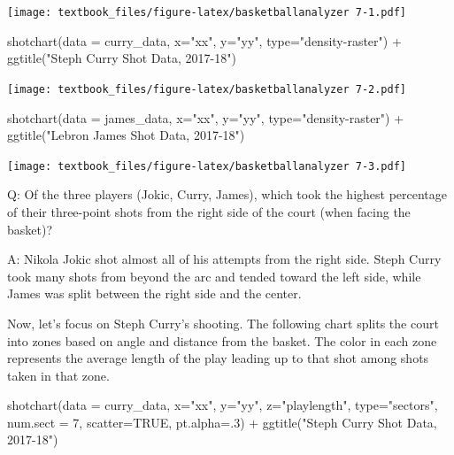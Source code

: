 \documentclass[
  11pt,
]{book}
\newenvironment{Shaded}{\begin{snugshade}}{\end{snugshade}}
\newcommand{\AttributeTok}[1]{\textcolor[rgb]{0.77,0.63,0.00}{#1}}
\newcommand{\ConstantTok}[1]{\textcolor[rgb]{0.00,0.00,0.00}{#1}}
\newcommand{\DecValTok}[1]{\textcolor[rgb]{0.00,0.00,0.81}{#1}}
\newcommand{\FunctionTok}[1]{\textcolor[rgb]{0.00,0.00,0.00}{#1}}
\newcommand{\NormalTok}[1]{#1}
\newcommand{\SpecialCharTok}[1]{\textcolor[rgb]{0.00,0.00,0.00}{#1}}
\newcommand{\StringTok}[1]{\textcolor[rgb]{0.31,0.60,0.02}{#1}}
\theoremstyle{definition}
\theoremstyle{definition}
\theoremstyle{definition}
\theoremstyle{definition}
\theoremstyle{remark}
\begin{document}
\texttt{[image: textbook\_files/figure-latex/basketballanalyzer 7-1.pdf]}

\begin{Shaded}
\begin{Highlighting}[]
\FunctionTok{shotchart}\NormalTok{(}\AttributeTok{data =}\NormalTok{ curry\_data, }\AttributeTok{x=}\StringTok{"xx"}\NormalTok{, }\AttributeTok{y=}\StringTok{"yy"}\NormalTok{, }\AttributeTok{type=}\StringTok{"density{-}raster"}\NormalTok{) }\SpecialCharTok{+} 
  \FunctionTok{ggtitle}\NormalTok{(}\StringTok{"Steph Curry Shot Data, 2017{-}18"}\NormalTok{)}
\end{Highlighting}
\end{Shaded}

\texttt{[image: textbook\_files/figure-latex/basketballanalyzer 7-2.pdf]}

\begin{Shaded}
\begin{Highlighting}[]
\FunctionTok{shotchart}\NormalTok{(}\AttributeTok{data =}\NormalTok{ james\_data, }\AttributeTok{x=}\StringTok{"xx"}\NormalTok{, }\AttributeTok{y=}\StringTok{"yy"}\NormalTok{, }\AttributeTok{type=}\StringTok{"density{-}raster"}\NormalTok{) }\SpecialCharTok{+} 
  \FunctionTok{ggtitle}\NormalTok{(}\StringTok{"Lebron James Shot Data, 2017{-}18"}\NormalTok{)}
\end{Highlighting}
\end{Shaded}

\texttt{[image: textbook\_files/figure-latex/basketballanalyzer 7-3.pdf]}

Q: Of the three players (Jokic, Curry, James), which took the highest percentage of their three-point shots from the right side of the court (when facing the basket)?

A: Nikola Jokic shot almost all of his attempts from the right side. Steph Curry took many shots from beyond the arc and tended toward the left side, while James was split between the right side and the center.

Now, let's focus on Steph Curry's shooting. The following chart splits the court into zones based on angle and distance from the basket. The color in each zone represents the average length of the play leading up to that shot among shots taken in that zone.

\begin{Shaded}
\begin{Highlighting}[]
\FunctionTok{shotchart}\NormalTok{(}\AttributeTok{data =}\NormalTok{ curry\_data, }\AttributeTok{x=}\StringTok{"xx"}\NormalTok{, }\AttributeTok{y=}\StringTok{"yy"}\NormalTok{, }\AttributeTok{z=}\StringTok{"playlength"}\NormalTok{, }
          \AttributeTok{type=}\StringTok{"sectors"}\NormalTok{, }\AttributeTok{num.sect =} \DecValTok{7}\NormalTok{, }\AttributeTok{scatter=}\ConstantTok{TRUE}\NormalTok{, }\AttributeTok{pt.alpha=}\NormalTok{.}\DecValTok{3}\NormalTok{) }\SpecialCharTok{+} 
  \FunctionTok{ggtitle}\NormalTok{(}\StringTok{"Steph Curry Shot Data, 2017{-}18"}\NormalTok{)}
\end{Highlighting}
\end{Shaded}
\end{document}
